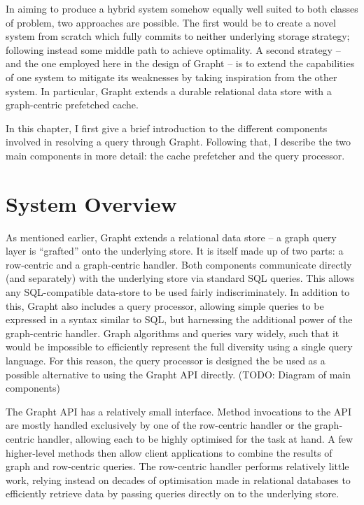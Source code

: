 
In aiming to produce a hybrid system somehow equally well suited to both
classes of problem, two approaches are possible. The first would be to create a
novel system from scratch which fully commits to neither underlying storage
strategy; following instead some middle path to achieve optimality. A second
strategy -- and the one employed here in the design of Grapht -- is to extend
the capabilities of one system to mitigate its weaknesses by taking inspiration
from the other system. In particular, Grapht extends a durable relational data
store with a graph-centric prefetched cache.

In this chapter, I first give a brief introduction to the different components
involved in resolving a query through Grapht. Following that, I describe the
two main components in more detail: the cache prefetcher and the query
processor.






\section{System Overview}

As mentioned earlier, Grapht extends a relational data store -- a graph query
layer is ``grafted'' onto the underlying store.  It is itself made up of two
parts: a row-centric and a graph-centric handler. Both components communicate
directly (and separately) with the underlying store via standard SQL queries.
This allows any SQL-compatible data-store to be used fairly indiscriminately.
In addition to this, Grapht also includes a query processor, allowing simple
queries to be expressed in a syntax similar to SQL, but harnessing the
additional power of the graph-centric handler. Graph algorithms and queries
vary widely, such that it would be impossible to efficiently represent the
full diversity using a single query language. For this reason, the query
processor is designed the be used  as a possible alternative to using the
Grapht API directly. (TODO: Diagram of main components)


The Grapht API has a relatively small interface. Method invocations to the API
are mostly handled exclusively by one of the row-centric handler or the graph-centric
handler, allowing each to be highly optimised for the task at hand. A few
higher-level methods then allow client applications to combine the results of
graph and row-centric queries.  The row-centric handler performs relatively
little work, relying instead on decades of optimisation made in relational
databases to efficiently retrieve data by passing queries directly on to the
underlying store.

